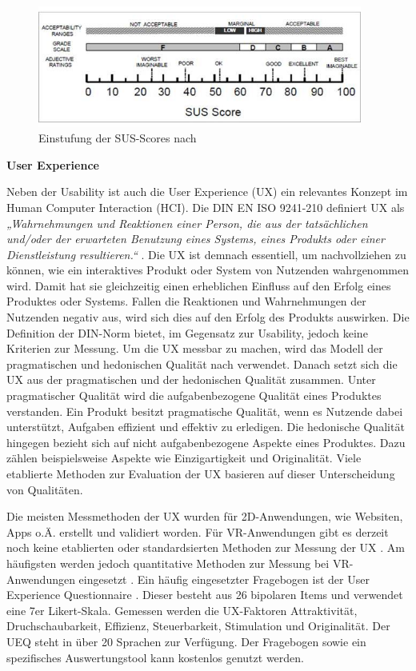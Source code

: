 \begin{figure}[tbh]
    \centering
    \includegraphics[width=0.95\textwidth]{images/SUS-Interpretation.jpg}
    \caption{Einstufung der SUS-Scores nach \citet{bangor_empirical_2008}}
    \label{fig:susInterpretation}
\end{figure}

\textbf{User Experience}

Neben der Usability ist auch die User Experience (UX) ein relevantes Konzept im Human Computer Interaction (HCI). Die DIN EN ISO 9241-210 definiert UX als \textit{„Wahrnehmungen und Reaktionen einer Person, die aus der tatsächlichen und/oder der erwarteten Benutzung eines Systems, eines Produkts oder einer Dienstleistung resultieren.“} \citep{DINISO9241}. Die UX ist demnach essentiell, um nachvollziehen zu können, wie ein interaktives Produkt oder System von Nutzenden wahrgenommen wird. Damit hat sie gleichzeitig einen erheblichen Einfluss auf den Erfolg eines Produktes oder Systems. Fallen die Reaktionen und Wahrnehmungen der Nutzenden negativ aus, wird sich dies auf den Erfolg des Produkts auswirken. Die Definition der DIN-Norm bietet, im Gegensatz zur Usability, jedoch keine Kriterien zur Messung. Um die UX messbar zu machen, wird das Modell der pragmatischen und hedonischen Qualität nach \citet{hassenzahl_user_2008} verwendet. Danach setzt sich die UX aus der pragmatischen und der hedonischen Qualität zusammen. Unter pragmatischer Qualität wird die aufgabenbezogene Qualität eines Produktes verstanden. Ein Produkt besitzt pragmatische Qualität, wenn es Nutzende dabei unterstützt, Aufgaben effizient und effektiv zu erledigen. Die hedonische Qualität hingegen bezieht sich auf nicht aufgabenbezogene Aspekte eines Produktes. Dazu zählen beispielsweise Aspekte wie Einzigartigkeit und Originalität. Viele etablierte Methoden zur Evaluation der UX basieren auf dieser Unterscheidung von Qualitäten. 

Die meisten Messmethoden der UX wurden für 2D-Anwendungen, wie Websiten, Apps o.Ä. erstellt und validiert worden. Für VR-Anwendungen gibt es derzeit noch keine etablierten oder standardsierten Methoden zur Messung der UX \citep{alexandrovsky_evaluating_2021}. Am häufigsten werden jedoch quantitative Methoden zur Messung bei VR-Anwendungen eingesetzt \citep{kim_systematic_2020}. Ein häufig eingesetzter Fragebogen ist der User Experience Questionnaire \citep{laugwitz_construction_2008}. Dieser besteht aus 26 bipolaren Items und verwendet eine 7er Likert-Skala. Gemessen werden die UX-Faktoren Attraktivität, Druchschaubarkeit, Effizienz, Steuerbarkeit, Stimulation und Originalität. Der UEQ steht in über 20 Sprachen zur Verfügung. Der Fragebogen sowie ein spezifisches Auswertungstool kann kostenlos genutzt werden. 

